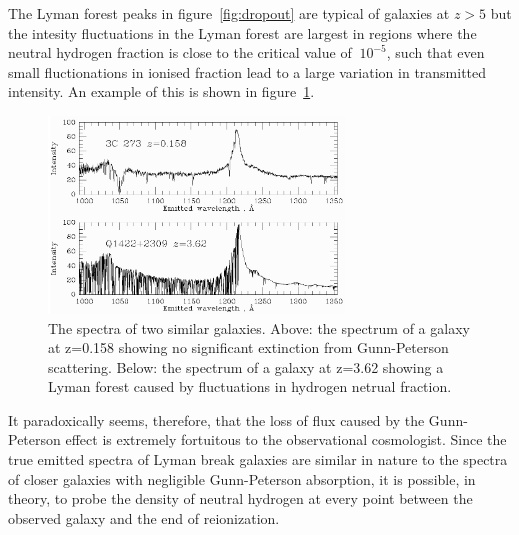 		The Lyman forest peaks in figure~\ref{fig:dropout} are typical of galaxies at $z>5$ but the intesity fluctuations in the Lyman forest are largest in regions where the neutral hydrogen fraction is close to the critical value of $~10^{-5}$, such that even small fluctionations in ionised fraction lead to a large variation in transmitted intensity. An example of this is shown in figure~\ref{fig:forest}.
		\begin{figure}[htbp]
			\centering
			\includegraphics[width=0.7\textwidth]{../Images/forest.png}
			\caption{The spectra of two similar galaxies. Above: the spectrum of a galaxy at z=0.158 showing no significant extinction from Gunn-Peterson scattering. Below: the spectrum of a galaxy at z=3.62 showing a Lyman forest caused by fluctuations in hydrogen netrual fraction.}
			\label{fig:forest}
		\end{figure}

		It paradoxically seems, therefore, that the loss of flux caused by the Gunn-Peterson effect is extremely fortuitous to the observational cosmologist. Since the true emitted spectra of Lyman break galaxies are similar in nature to the spectra of closer galaxies with negligible Gunn-Peterson absorption, it is possible, in theory, to probe the density of neutral hydrogen at every point between the observed galaxy and the end of reionization.

